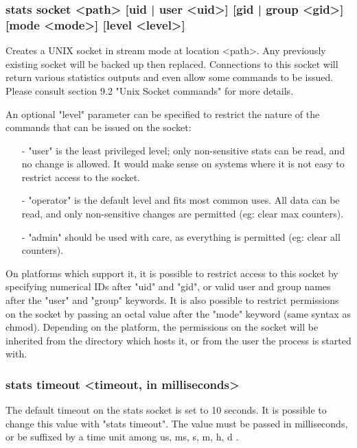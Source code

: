 \subsubsection[stats socket]{stats socket <path> [{uid | user} <uid>] [{gid | group} <gid>] [mode <mode>] [level <level>]}
  Creates a UNIX socket in stream mode at location <path>. Any previously
  existing socket will be backed up then replaced. Connections to this socket
  will return various statistics outputs and even allow some commands to be
  issued. Please consult section 9.2 "Unix Socket commands" for more details.
  
  An optional "level" parameter can be specified to restrict the nature of
  the commands that can be issued on the socket:
  
  \begin{itemize}
    \item[-] "user" is the least privileged level; only non-sensitive stats can be
      read, and no change is allowed. It would make sense on systems where it
      is not easy to restrict access to the socket.

    \item[-] "operator" is the default level and fits most common uses. All data can
      be read, and only non-sensitive changes are permitted (eg: clear max
      counters).

    \item[-] "admin" should be used with care, as everything is permitted (eg: clear
      all counters).
  \end{itemize}
  
  On platforms which support it, it is possible to restrict access to this
  socket by specifying numerical IDs after "uid" and "gid", or valid user and
  group names after the "user" and "group" keywords. It is also possible to
  restrict permissions on the socket by passing an octal value after the "mode"
  keyword (same syntax as chmod). Depending on the platform, the permissions on
  the socket will be inherited from the directory which hosts it, or from the
  user the process is started with.

\subsubsection[stats timeout]{stats timeout <timeout, in milliseconds>}
  The default timeout on the stats socket is set to 10 seconds. It is possible
  to change this value with "stats timeout". The value must be passed in
  milliseconds, or be suffixed by a time unit among { us, ms, s, m, h, d }.

